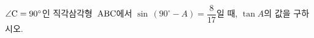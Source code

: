 $\angle\mathrm{C}=90^\circ$인 직각삼각형~$\mathrm{ABC}$에서 $\sin\,(90^\circ-A)=\dfrac{8}{17}$일 때, $\tan A$의 값을 구하시오.
